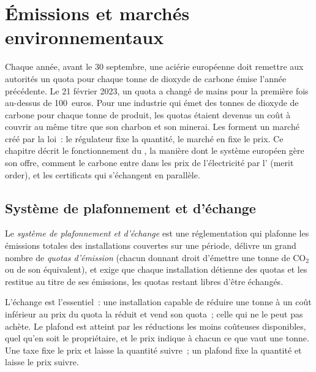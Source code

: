 \chapter{Émissions et marchés environnementaux}\label{ch:m3:emissions-and-environmental-markets}

Chaque année, avant le 30 septembre, une aciérie européenne doit remettre aux autorités un
quota pour chaque tonne de dioxyde de carbone émise l'année précédente. Le 21 février
2023, un quota a changé de mains pour la première fois au-dessus de 100~euros. Pour une industrie
qui émet des tonnes de dioxyde de carbone pour chaque tonne de produit, les quotas étaient devenus un
coût à couvrir au même titre que son charbon et son minerai. Les  forment un marché créé par la loi~: le régulateur fixe la quantité,
le marché en fixe le prix. Ce chapitre décrit le fonctionnement du , la manière dont le
système européen gère son offre, comment le carbone entre dans les prix de l'électricité par l' (merit order), et les
certificats qui s'échangent en parallèle.

\section{Système de plafonnement et d'échange}

\begin{definition}\label{def:m3:emissions-and-environmental-markets:cap}
Le \emph{système de plafonnement et d'échange} est une réglementation qui plafonne les émissions totales des
installations couvertes sur une période, délivre un grand nombre de \emph{quotas
d'émission} (chacun donnant droit d'émettre une tonne de CO$_2$ ou de son
équivalent), et exige que chaque installation détienne des quotas et les restitue au titre de ses
émissions, les quotas restant libres d'être échangés.
\end{definition}

L'échange est l'essentiel~: une installation capable de réduire une tonne à un coût inférieur au
prix du quota la réduit et vend son quota~; celle qui ne le peut pas achète. Le plafond est atteint par les réductions les moins coûteuses
disponibles, quel qu'en soit le propriétaire, et le prix indique à chacun ce que
vaut une tonne. Une taxe fixe le prix et laisse la quantité suivre~; un plafond fixe la quantité et laisse
le prix suivre.

